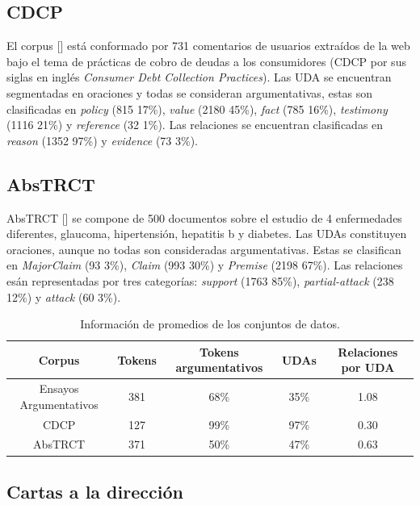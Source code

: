 \subsection{CDCP}\label{corpus:cdcp}

El corpus [\cite{niculae2017argument}] está conformado por 731 comentarios de usuarios extraídos de la web bajo el tema de 
prácticas de cobro de deudas a los consumidores (CDCP por sus siglas en inglés \emph{Consumer Debt Collection Practices}).
Las UDA se encuentran segmentadas en oraciones y todas se consideran argumentativas, estas son clasificadas en 
\emph{policy} (815 17\%), \emph{value} (2180 45\%), \emph{fact} (785 16\%), \emph{testimony} (1116 21\%) y \emph{reference} (32 1\%). 
Las relaciones se encuentran clasificadas en \emph{reason} (1352 97\%) y \emph{evidence} (73 3\%).

\subsection{AbsTRCT}

AbsTRCT [\cite{mayer2020transformer}] se compone de 500 documentos sobre el estudio de 4 enfermedades diferentes,
glaucoma, hipertensión, hepatitis b y diabetes. Las UDAs constituyen oraciones, aunque no todas son consideradas
argumentativas. Estas se clasifican en \emph{MajorClaim} (93 3\%), \emph{Claim} (993 30\%) y \emph{Premise} (2198 67\%).
Las relaciones esán representadas por tres categorías: \emph{support} (1763 85\%), \emph{partial-attack} (238 12\%) y
\emph{attack} (60 3\%).

\begin{table}[h!]
	\begin{center}
		\begin{tabular}{|c|c|c|c|c|} \hline
		Corpus		            & Tokens 	& Tokens argumentativos	& UDAs   & Relaciones por UDA    \\ \hline
		Ensayos Argumentativos  & 381		& 68\% 		& 35\% 	  & 1.08		\\ \hline
		CDCP		            & 127		& 99\% 		& 97\% 	  & 0.30		\\ \hline
		AbsTRCT	                & 371		& 50\% 		& 47\% 	  & 0.63		\\ \hline
		\end{tabular}
	\caption{Información de promedios de los conjuntos de datos.}\label{table:corpus_info}
	\end{center}
\end{table}

\subsection{Cartas a la dirección}

